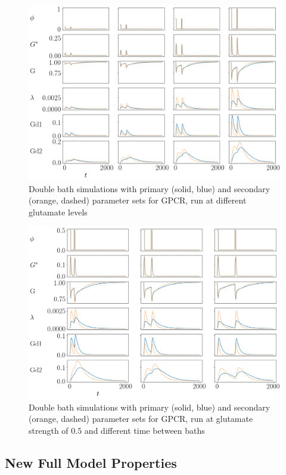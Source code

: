 \documentclass[12pt]{article}
\begin{document}
\begin{figure}[H]
	\includegraphics[width=1.0\linewidth]{figures/gpcr_param_gluts.png}
	\centering
	\caption{Double bath simulations with primary (solid, blue) and secondary (orange, dashed) parameter sets for GPCR, run at different glutamate levels}
	\label{fig:gpcr_param_gluts}
\end{figure}

\begin{figure}[H]
	\includegraphics[width=1.0\linewidth]{figures/gpcr_param_times.png}
	\centering	
	\caption{Double bath simulations with primary (solid, blue) and secondary (orange, dashed) parameter sets for GPCR, run at glutamate strength of $0.5$ and different time between baths}
	\label{fig:gpcr_param_times}
\end{figure}

\subsection{New Full Model Properties}
\end{document}
